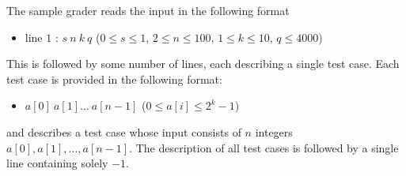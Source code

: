The sample grader reads the input in the following format
\begin{itemize}
\item line $1$ : $s\ n\ k\ q$ ($0 \leq s \leq 1$, $2 \leq n \leq 100$, $1 \leq k \leq 10$, $q \leq 4000$)
\end{itemize}

This is followed by some number of lines, each describing a single test case. Each test case is
provided in the following format:
\begin{itemize}
\item $a[0]\ a[1]\ldots \ a[n - 1]$ ($0 \leq a[i] \leq 2^k-1$)
\end{itemize}

and describes a test case whose input consists of $n$ integers $a[0], a[1],\ldots, a[n-1]$.
The
description of all test cases is followed by a single line containing solely $-1$.

